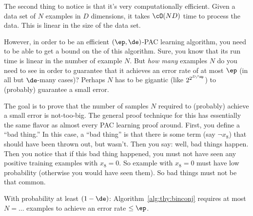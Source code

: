 The second thing to notice is that it's very computationally
efficient.  Given a data set of $N$ examples in $D$ dimensions, it
takes $\cO(ND)$ time to process the data.  This is linear in the size
of the data set.

However, in order to be an efficient $(\ep,\de)$-PAC learning
algorithm, you need to be able to get a bound on the  of this algorithm.  Sure, you know that its run time is
linear in the number of example $N$.  But \emph{how many} examples $N$
do you need to see in order to guarantee that it achieves an error
rate of at most $\ep$ (in all but $\de$-many cases)?  Perhaps $N$ has
to be gigantic (like $2^{2^{D/\ep}}$) to (probably) guarantee a small
error.

The goal is to prove that the number of samples $N$ required to
(probably) achieve a small error is not-too-big.  The general proof
technique for this has essentially the same flavor as almost every PAC
learning proof around.  First, you define a ``bad thing.''  In this
case, a ``bad thing'' is that there is some term (say $\lnot x_8$)
that should have been thrown out, but wasn't.  Then you say: well, bad
things happen.  Then you notice that if this bad thing happened, you
must not have seen any positive training examples with $x_8=0$.  So
example with $x_8=0$ must have low probability (otherwise you would
have seen them).  So bad things must not be that common.

\begin{theorem} \label{thm:thy:conj}
  With probability at least $(1-\de)$: Algorithm~\ref{alg:thy:binconj}
  requires at most $N = \dots$ examples to achieve an error rate $\leq
  \ep$.
\end{theorem}

